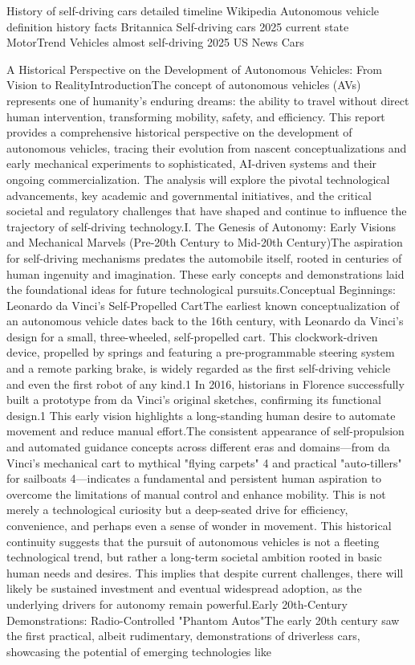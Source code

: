     History of self-driving cars detailed timeline Wikipedia
    Autonomous vehicle definition history facts Britannica
    Self-driving cars 2025 current state MotorTrend
    Vehicles almost self-driving 2025 US News Cars



A Historical Perspective on the Development of Autonomous Vehicles: From Vision to RealityIntroductionThe concept of autonomous vehicles (AVs) represents one of humanity's enduring dreams: the ability to travel without direct human intervention, transforming mobility, safety, and efficiency. This report provides a comprehensive historical perspective on the development of autonomous vehicles, tracing their evolution from nascent conceptualizations and early mechanical experiments to sophisticated, AI-driven systems and their ongoing commercialization. The analysis will explore the pivotal technological advancements, key academic and governmental initiatives, and the critical societal and regulatory challenges that have shaped and continue to influence the trajectory of self-driving technology.I. The Genesis of Autonomy: Early Visions and Mechanical Marvels (Pre-20th Century to Mid-20th Century)The aspiration for self-driving mechanisms predates the automobile itself, rooted in centuries of human ingenuity and imagination. These early concepts and demonstrations laid the foundational ideas for future technological pursuits.Conceptual Beginnings: Leonardo da Vinci's Self-Propelled CartThe earliest known conceptualization of an autonomous vehicle dates back to the 16th century, with Leonardo da Vinci's design for a small, three-wheeled, self-propelled cart. This clockwork-driven device, propelled by springs and featuring a pre-programmable steering system and a remote parking brake, is widely regarded as the first self-driving vehicle and even the first robot of any kind.1 In 2016, historians in Florence successfully built a prototype from da Vinci's original sketches, confirming its functional design.1 This early vision highlights a long-standing human desire to automate movement and reduce manual effort.The consistent appearance of self-propulsion and automated guidance concepts across different eras and domains—from da Vinci's mechanical cart to mythical "flying carpets" 4 and practical "auto-tillers" for sailboats 4—indicates a fundamental and persistent human aspiration to overcome the limitations of manual control and enhance mobility. This is not merely a technological curiosity but a deep-seated drive for efficiency, convenience, and perhaps even a sense of wonder in movement. This historical continuity suggests that the pursuit of autonomous vehicles is not a fleeting technological trend, but rather a long-term societal ambition rooted in basic human needs and desires. This implies that despite current challenges, there will likely be sustained investment and eventual widespread adoption, as the underlying drivers for autonomy remain powerful.Early 20th-Century Demonstrations: Radio-Controlled "Phantom Autos"The early 20th century saw the first practical, albeit rudimentary, demonstrations of driverless cars, showcasing the potential of emerging technologies like 